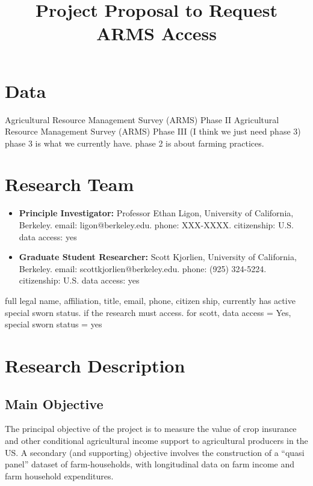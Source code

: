 \documentclass{article}
\title{Project Proposal to Request ARMS Access}
\begin{document}
\maketitle

\section*{Data}
Agricultural Resource Management Survey (ARMS) Phase II
Agricultural Resource Management Survey (ARMS) Phase III (I think we just need phase 3) 
phase 3 is what we currently have. phase 2 is about farming practices. 

\section*{Research Team} 
\begin{itemize}
    \item \textbf{Principle Investigator:} Professor Ethan Ligon, University of California, Berkeley. email: ligon@berkeley.edu. phone: XXX-XXXX. citizenship: U.S. data access: yes
    \item \textbf{Graduate Student Researcher:} Scott Kjorlien, University of California, Berkeley. email: scottkjorlien@berkeley.edu. phone: (925) 324-5224. citizenship: U.S. data access: yes 
\end{itemize}

full legal name, affiliation, title, email, phone, citizen ship, currently has active special sworn status. if the research must access. 
for scott, data access = Yes, special sworn status = yes


\section*{Research Description} 
\subsection*{Main Objective}
The principal objective of the project is to measure the value of crop insurance
and other conditional agricultural income support to agricultural producers in the
US. A secondary (and supporting) objective involves the construction of a “quasi panel”
dataset of farm-households, with longitudinal data on farm income and farm household
expenditures.
\end{document}
